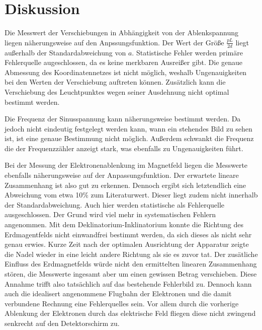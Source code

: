 \section{Diskussion}
\label{sec:Diskussion}

Die Messwert der Verschiebungen in Abhängigkeit von der Ablenkspannung liegen näherungsweise auf den Anpssungsfunktion.
Der Wert der Größe $\frac{pL}{2d}$ liegt außerhalb der Standardabweichung von $a$. Statistische Fehler
werden primäre Fehlerquelle augeschlossen, da es keine merkbaren Ausreißer gibt. Die genaue Abmessung
des Koordinatennetzes ist nicht möglich, weshalb Ungenauigkeiten bei den Werten der Verschiebung auftreten können.
Zusätzlich kann die Verschiebung des Leuchtpunktes wegen seiner Ausdehnung nicht optimal bestimmt werden.

Die Frequenz der Sinusspannung kann näherungsweise bestimmt werden. Da jedoch nicht eindeutig
festgelegt werden kann, wann ein stehendes Bild zu sehen ist, ist eine genaue Bestimmung nicht möglich.
Außerdem schwankt die Frequenz die der Frequenzzähler anzeigt stark, was ebenfalls zu Ungenauigkeiten führt.

Bei der Messung der Elektronenablenkung im Magnetfeld liegen die Messwerte ebenfalls näherungsweise auf der Anpassungsfunktion.
Der erwartete lineare Zusammenhang ist also gut zu erkennen. Dennoch ergibt sich letztendlich eine Abweichung vom etwa 10\% zum
Literaturwert. Dieser liegt zudem nicht innerhalb der Standardabweichung. Auch hier werden statistische als Fehlerquelle ausgeschlossen.
Der Grund wird viel mehr in systematischen Fehlern angenommen. Mit dem Deklinatorium-Inklinatorium konnte die Richtung des Erdmagentfelds
nicht einwandfrei bestimmt werden, da sich dieses als nicht sehr genau erwies. Kurze Zeit nach der optimalen Ausrichtung der Apparatur
zeigte die Nadel wieder in eine leicht andere Richtung als sie es zuvor tat. Der zusätliche Einfluss des Erdmagnetfelds würde nicht den
ermittelten linearen Zusammenhang stören, die Messwerte ingesamt aber um einen gewissen Betrag verschieben. Diese Annahme trifft also
tatsächlich auf das bestehende Fehlerbild zu. Dennoch kann auch die idealisert angenommene Flugbahn der Elektronen und die damit
verbundene Rechnung eine Fehlerquelles sein. Vor allem durch die vorherige Ablenkung der Elektronen durch das elektrische Feld fliegen
diese nicht zwingend senkrecht auf den Detektorschirm zu.
